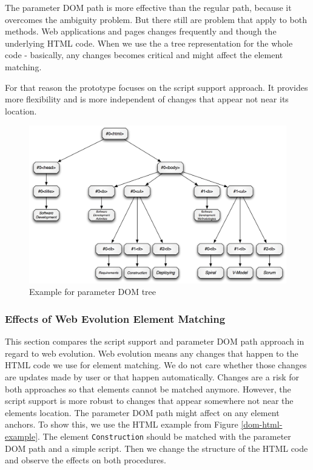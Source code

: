 The parameter DOM path is more effective than the regular path, because it overcomes the ambiguity problem. But there still are problem that apply to both methods. Web applications and pages changes frequently and though the underlying HTML code. When we use the a tree representation for the whole code - basically, any changes becomes critical and might affect the element matching. 

For that reason the prototype focuses on the script support approach. It provides more flexibility and is more independent of changes that appear not near its location. 

\begin{figure}\centering
		\includegraphics[width=13cm]{images/dom-paramaterized-tree-example.png}
		\caption{Example for parameter DOM tree}
		\label{dom-paramaterized-tree-example}
\end{figure} 

\subsubsection{Effects of Web Evolution Element Matching}

This section compares the script support and parameter DOM path approach in regard to web evolution. Web evolution means any changes that happen to the HTML code we use for element matching. We do not care whether those changes are updates made by user or that happen automatically. Changes are a risk for both approaches so that elements cannot be matched anymore. However, the script support is more robust to changes that appear somewhere not near the elements location. The parameter DOM path might affect on any element anchors.
To show this, we use the HTML example from Figure \ref{dom-html-example}. The element \verb^Construction^ should be matched with the parameter DOM path and a simple script. Then we change the structure of the HTML code and observe the effects on both procedures.

